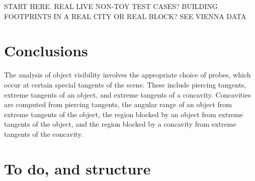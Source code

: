 \documentclass[12pt]{article}
\newif\ifJournal
\begin{document}
START HERE.
REAL LIVE NON-TOY TEST CASES? BUILDING FOOTPRINTS IN A REAL CITY OR REAL BLOCK?
SEE VIENNA DATA

\section{Conclusions}

The analysis of object visibility involves the appropriate choice of probes,
which occur at certain special tangents of the scene.
These include piercing tangents, extreme tangents of an object, and extreme
tangents of a concavity.
Concavities are computed from piercing tangents,
the angular range of an object from extreme tangents of the object,
the region blocked by an object from extreme tangents of the object,
and the region blocked by a concavity from extreme tangents of the concavity. 


% 
\begin{thebibliography}{99}

\end{thebibliography}

\clearpage

\ifJournal
\section{Robust computation}

In computing the inside of a tangent or the concavity defined by a piercing tangent,
we test where $B(t + \epsilon)$ lies relative to a line through $B(t)$.
This is a potentially fragile computation: we must choose $\epsilon$ small enough
to guarantee that $B[t,t+\epsilon]$ is all on the same side of the line and hasn't
yet crossed the line again, otherwise the test is meaningless.
The size of $\epsilon$ can be determined using arguments developed in the exact
curve work of SoCG 2004.
EXPLORE.

[For robustness, we may want to choose more central probes in general object visibility:
all of the probes are at tangents, but that's inherent to the method isn't it?.]

computation of fundamental operations (tangents through a point; and some trivial
   ones: line/curve intersection, inside/outside of tangent);
robust computation of fundamental operations (optional)
\fi


\clearpage

\section{To do, and structure}
\end{document}
